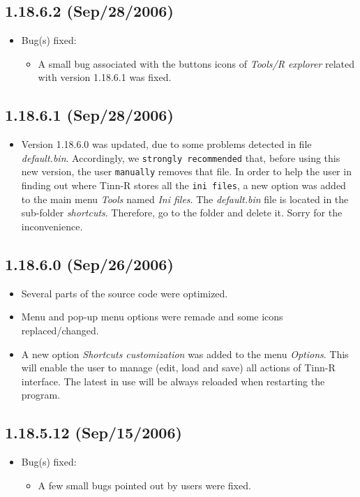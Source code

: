 \subsection*{1.18.6.2 (Sep/28/2006)}
\begin{itemize}
  \item Bug(s) fixed:
    \begin{itemize}
      \item A small bug associated with the buttons icons of \textit{Tools/R explorer}
        related with version 1.18.6.1 was fixed.
    \end{itemize}
\end{itemize}


\subsection*{1.18.6.1 (Sep/28/2006)}
\begin{itemize}
  \item Version 1.18.6.0 was updated, due to some problems detected in
    file \textit{default.bin}. Accordingly, we \texttt{strongly recommended}
    that, before using this new version, the user \texttt{manually} removes
    that file. In order to help the user in finding out where Tinn-R stores all
    the \texttt{ini files}, a new option was added to the main menu
    \textit{Tools} named \textit{Ini files}. The \textit{default.bin} file
    is located in the sub-folder \textit{shortcuts}. Therefore, go to the
    folder and delete it. Sorry for the inconvenience.
\end{itemize}


\subsection*{1.18.6.0 (Sep/26/2006)}
\begin{itemize}
  \item Several parts of the source code were optimized.
  \item Menu and pop-up menu options were remade and some icons replaced/changed.
  \item A new option \textit{Shortcuts customization} was added to the menu
    \textit{Options}. This will enable the user to manage (edit, load and save)
    all actions of Tinn-R interface. The latest in use will be always reloaded
    when restarting the program.
\end{itemize}


\subsection*{1.18.5.12 (Sep/15/2006)}
\begin{itemize}
  \item Bug(s) fixed:
    \begin{itemize}
      \item A few small bugs pointed out by users were fixed.
    \end{itemize}
\end{itemize}


